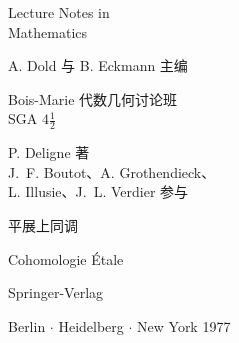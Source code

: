 \begin{titlepage}
\sffamily
\setlength{\parindent}{0pt}
\vspace*{-24bp}
{\fontsize{24}{26}\selectfont Lecture Notes in\\Mathematics\par}
\vspace{14bp}
{\small A. Dold 与 B. Eckmann 主编\par}
\vspace{47bp}
{\fontsize{18}{22}\par}
\vspace{30bp}
{\large Bois-Marie 代数几何讨论班\\SGA $4\frac12$\par}
\vspace{5bp}
P. Deligne 著\\
J.~F. Boutot、A. Grothendieck、\\
L. Illusie、J.~L. Verdier 参与
\vfill
{\fontsize{21}{26}\selectfont 平展上同调\par}
\vspace{9bp}
{\normalsize Cohomologie Étale\par}
\vspace{48bp}
{\large Springer-Verlag\par}
Berlin $\cdot$ Heidelberg $\cdot$ New York 1977
\vspace{4bp}
\end{titlepage}
